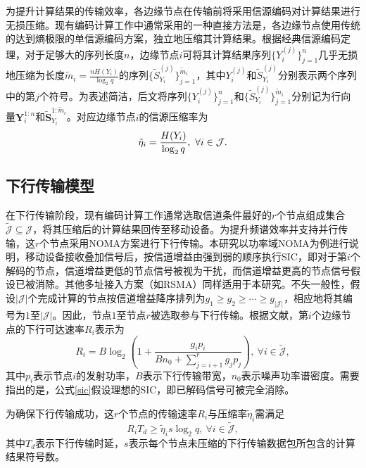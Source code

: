 为提升计算结果的传输效率，各边缘节点在传输前将采用信源编码对计算结果进行无损压缩。现有编码计算工作中通常采用的一种直接方法是，各边缘节点使用传统的达到熵极限的单信源编码方案，独立地压缩其计算结果。根据经典信源编码定理，对于足够大的序列长度$n$，边缘节点$i$可将其计算结果序列$\{Y_i^{(j)}\}_{j=1}^n$几乎无损地压缩为长度$\tilde{m}_i=\frac{n H(Y_i)}{\log_2q}$的序列$\{\tilde{S}_{Y_i}^{(j)}\}_{j=1}^{\tilde{m}_i}$，其中$Y_i^{(j)}$和$\tilde{S}_{Y_i}^{(j)}$分别表示两个序列中的第$j$个符号。为表述简洁，后文将序列$\{Y_i^{(j)}\}_{j=1}^n$和$\{\tilde{S}_{Y_i}^{(j)}\}_{j=1}^{\tilde{m}_i}$分别记为行向量$\mathbf{Y}_i^{1:n}$和$\mathbf{\tilde{S}}_{Y_i}^{1:\tilde{m}_i}$。对应边缘节点$i$的信源压缩率为
\begin{equation}
	\setlength\belowdisplayskip{3pt}
	\tilde{\eta}_i=\frac{H(Y_i)}{\log_2q},~\forall i\in\mathcal{J}.\vspace{0.03cm}\label{straight}
\end{equation}

\subsection{下行传输模型}\label{communication model}
在下行传输阶段，现有编码计算工作通常选取信道条件最好的$r$个节点组成集合$\tilde{\mathcal{J}}\subseteq\mathcal{J}$，将其压缩后的计算结果回传至移动设备。为提升频谱效率并支持并行传输，这$r$个节点采用NOMA方案进行下行传输。本研究以功率域NOMA为例进行说明，移动设备接收叠加信号后，按信道增益由强到弱的顺序执行SIC，即对于第$i$个解码的节点，信道增益更低的节点信号被视为干扰，而信道增益更高的节点信号假设已被消除。其他多址接入方案（如RSMA）同样适用于本研究。不失一般性，假设$|\mathcal{J}|$个完成计算的节点按信道增益降序排列为$g_1\geq g_2\geq \cdots \geq
g_{|\mathcal{J}|}$，相应地将其编号为$1$至$|\mathcal{J}|$。因此，节点$1$至节点$r$被选取参与下行传输。根据文献\cite{8357810}，第$i$个边缘节点的下行可达速率$R_i$表示为
\begin{equation}
	R_i=B\log_2\left(1+\frac{g_ip_i}{Bn_0+\sum_{j=i+1}^{r}g_jp_j}\right),~\forall i\in\tilde{\mathcal{J}},\label{sic}
\end{equation}
其中$p_i$表示节点$i$的发射功率，$B$表示下行传输带宽，$n_0$表示噪声功率谱密度。需要指出的是，公式\eqref{sic}假设理想的SIC，即已解码信号可被完全消除。

为确保下行传输成功，这$r$个节点的传输速率$R_i$与压缩率$\tilde{\eta}_i$需满足
\begin{equation}
	R_{i}T_d\geq  \tilde{\eta}_i s\log_2q, ~ \forall i\in \tilde{\mathcal{J}},\label{rt>r'}
\end{equation}
其中$T_d$表示下行传输时延，$s$表示每个节点未压缩的下行传输数据包所包含的计算结果符号数。

